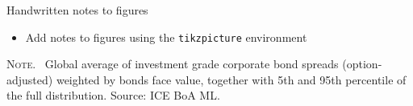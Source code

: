 \documentclass[10pt]{beamer}
\begin{document}
\begin{frame}[t]
	{Handwritten notes to figures}
	\begin{itemize}
		\item Add notes to figures using the \texttt{tikzpicture} environment
	\end{itemize}
	\begin{center}
		\begin{minipage}[b]{.6\textwidth}
			\tiny{{\scshape Note}. \ Global average of investment grade corporate bond spreads (option-adjusted) weighted by bonds face value, together with 5th and 95th percentile of the full distribution. Source: ICE BoA ML.} 
		\end{minipage}
	\end{center}
\end{frame}	

\end{document}
